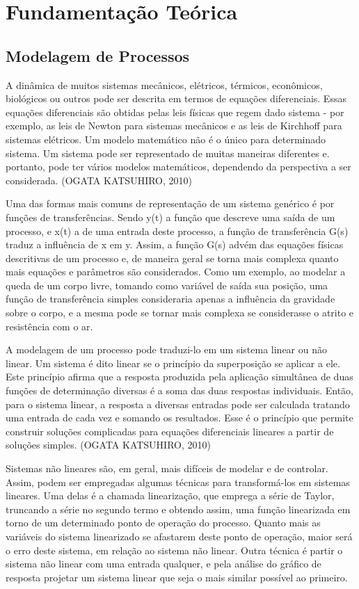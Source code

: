 \chapter{Fundamentação Teórica}

\section{Modelagem de Processos}

A dinâmica de muitos sistemas  mecânicos, elétricos, térmicos, econômicos, biológicos ou outros pode ser descrita em termos de equações diferenciais. Essas equações diferenciais são obtidas pelas leis físicas que regem dado sistema - por exemplo, as leis de Newton para sistemas mecânicos e as leis de Kirchhoff para sistemas elétricos. Um modelo matemático não é o único para determinado sistema. Um sistema pode ser representado de muitas maneiras diferentes e. portanto, pode ter vários modelos matemáticos, dependendo da perspectiva a ser considerada. (OGATA KATSUHIRO, 2010)

Uma das formas mais comuns de representação de um sistema genérico é por funções de transferências. Sendo y(t) a função que descreve uma saída de um processo, e x(t) a de uma entrada deste processo, a função de transferência G(s) traduz a influência de x em y. Assim, a função G(s) advém das equações físicas descritivas de um processo e, de maneira geral se torna mais complexa quanto mais equações e parâmetros são considerados. Como um exemplo, ao modelar a queda de um corpo livre, tomando como variável de saída sua posição, uma função de transferência simples consideraria apenas a influência da gravidade sobre o corpo, e a mesma pode se tornar mais complexa se considerasse o atrito e resistência com o ar.

A modelagem de um processo pode traduzi-lo em um sistema linear ou não linear. Um sistema é dito linear se o princípio da superposição se aplicar a ele. Este princípio afirma que a resposta produzida pela aplicação simultânea de duas funções de determinação diversas é a soma das duas respostas individuais. Então, para o sistema linear, a resposta a diversas entradas pode ser calculada tratando uma entrada de cada vez e somando os resultados. Esse é o princípio que permite construir soluções complicadas para equações diferenciais lineares a partir de soluções simples. (OGATA KATSUHIRO, 2010)

Sistemas não lineares são, em geral, mais difíceis de modelar e de controlar. Assim, podem ser empregadas algumas técnicas para transformá-los em sistemas lineares. Uma delas é a chamada linearização, que emprega a série de Taylor, truncando a série no segundo termo e obtendo assim, uma função linearizada em torno de um determinado ponto de operação do processo. Quanto mais as variáveis do sistema linearizado se afastarem deste ponto de operação, maior será o erro deste sistema, em relação ao sistema não linear. Outra técnica é partir o sistema não linear com uma entrada qualquer, e pela análise do gráfico de resposta projetar um sistema linear que seja o mais similar possível ao primeiro.

